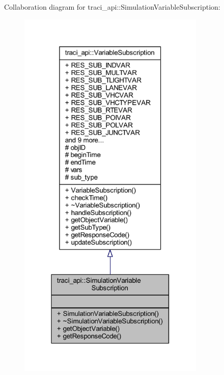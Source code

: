 Collaboration diagram for traci\+\_\+api\+:\+:Simulation\+Variable\+Subscription\+:
\nopagebreak
\begin{figure}[H]
\begin{center}
\leavevmode
\includegraphics[width=253pt]{classtraci__api_1_1_simulation_variable_subscription__coll__graph}
\end{center}
\end{figure}
